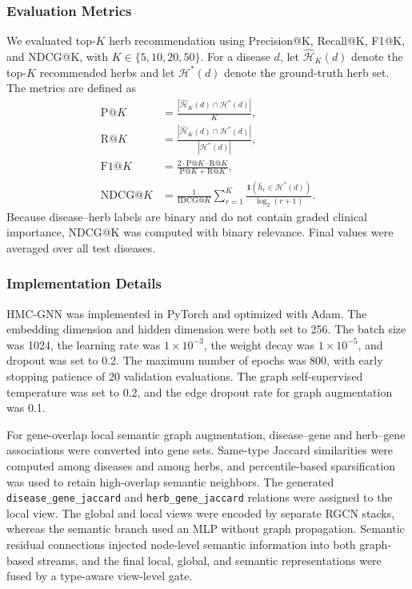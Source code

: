 \documentclass[journal,twoside,web]{ieeecolor}
\begin{document}
\subsubsection{Evaluation Metrics}
\label{subsubsec:metrics}

We evaluated top-$K$ herb recommendation using Precision@K, Recall@K, F1@K, and NDCG@K, with $K\in\{5,10,20,50\}$. For a disease $d$, let $\widehat{\mathcal{H}}_K(d)$ denote the top-$K$ recommended herbs and let $\mathcal{H}^{*}(d)$ denote the ground-truth herb set. The metrics are defined as
\begin{align}
\mathrm{P}@K &= \frac{|\widehat{\mathcal{H}}_K(d)\cap\mathcal{H}^{*}(d)|}{K}, \label{eq:precision}\\
\mathrm{R}@K &= \frac{|\widehat{\mathcal{H}}_K(d)\cap\mathcal{H}^{*}(d)|}{|\mathcal{H}^{*}(d)|}, \label{eq:recall}\\
\mathrm{F1}@K &= \frac{2\cdot \mathrm{P}@K\cdot \mathrm{R}@K}{\mathrm{P}@K+\mathrm{R}@K}, \label{eq:f1}\\
\mathrm{NDCG}@K &= \frac{1}{\mathrm{IDCG}@K}\sum_{r=1}^{K}\frac{\mathbf{1}(\hat{h}_r\in\mathcal{H}^{*}(d))}{\log_2(r+1)}. \label{eq:ndcg}
\end{align}
Because disease--herb labels are binary and do not contain graded clinical importance, NDCG@K was computed with binary relevance. Final values were averaged over all test diseases.

\subsubsection{Implementation Details}
\label{subsubsec:implementation}

HMC-GNN was implemented in PyTorch and optimized with Adam. The embedding dimension and hidden dimension were both set to 256. The batch size was 1024, the learning rate was $1\times10^{-3}$, the weight decay was $1\times10^{-5}$, and dropout was set to 0.2. The maximum number of epochs was 800, with early stopping patience of 20 validation evaluations. The graph self-supervised temperature was set to 0.2, and the edge dropout rate for graph augmentation was 0.1.

For gene-overlap local semantic graph augmentation, disease--gene and herb--gene associations were converted into gene sets. Same-type Jaccard similarities were computed among diseases and among herbs, and percentile-based sparsification was used to retain high-overlap semantic neighbors. The generated \texttt{disease\_gene\_jaccard} and \texttt{herb\_gene\_jaccard} relations were assigned to the local view. The global and local views were encoded by separate RGCN stacks, whereas the semantic branch used an MLP without graph propagation. Semantic residual connections injected node-level semantic information into both graph-based streams, and the final local, global, and semantic representations were fused by a type-aware view-level gate.
\end{document}
